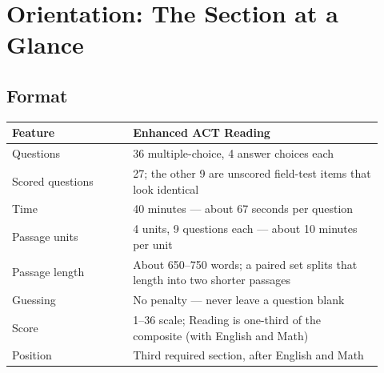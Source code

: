 \documentclass[11pt]{article}
\begin{document}
\maketitleblock

\begin{abstract}
This guide covers everything the Enhanced ACT Reading section tests: 36 questions in 40 minutes across four passage units (literary narrative, social science, humanities, and natural science), including one paired set of shorter passages and passages that pair text with a chart or table. It is organized around ACT's three reporting categories---Key Ideas \& Details, Craft \& Structure, and Integration of Knowledge \& Ideas---which are broken into eleven rules. Each rule gives the question stems to recognize, a method, the traps to expect, and a drill set built on original passages. The guide ends with a wrong-answer field guide, a pacing protocol, a one-page quick reference, an error log, and a complete answer key. Volume~2 is a full-length, timed practice section built to the same specifications.
\end{abstract}


\vspace{-4pt}
{\small\tableofcontents}

\section{Orientation: The Section at a Glance}

\subsection{Format}
\begin{center}
\begin{tabular}{@{}p{0.30\linewidth}p{0.62\linewidth}@{}}
\toprule
\textbf{Feature} & \textbf{Enhanced ACT Reading}\\
\midrule
Questions & 36 multiple-choice, 4 answer choices each\\
Scored questions & 27; the other 9 are unscored field-test items that look identical\\
Time & 40 minutes --- about 67 seconds per question\\
Passage units & 4 units, 9 questions each --- about 10 minutes per unit\\
Passage length & About 650--750 words; a paired set splits that length into two shorter passages\\
Guessing & No penalty --- never leave a question blank\\
Score & 1--36 scale; Reading is one-third of the composite (with English and Math)\\
Position & Third required section, after English and Math\\
\bottomrule
\end{tabular}
\end{center}
\end{document}
